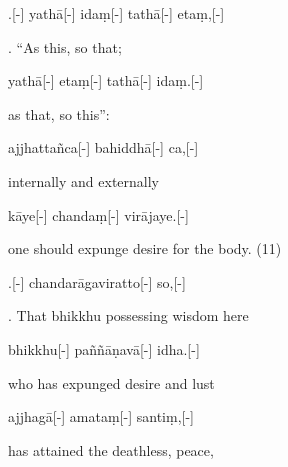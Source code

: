 \vskip 0.2in
\begin{samepage}
.[-] yathā[-] idaṃ[-] tathā[-] etaṃ,[-]
\endgl
\nopagebreak
\linespread{0.5}
\begin{spacin}{0.2}
{. “As this, so that;}
\end{spacin}
\vskip 12pt
\end{samepage}
\begin{samepage}
\begingl[glneveryline={\PaliGlossA,\PaliGlossB}]
yathā[-] etaṃ[-] tathā[-] idaṃ.[-]
\endgl
\nopagebreak
\linespread{0.5}
\begin{spacin}{0.2}
{\PaliGlossFT as that, so this”:}
\end{spacin}
\vskip 12pt
\end{samepage}
\begin{samepage}
\begingl[glneveryline={\PaliGlossA,\PaliGlossB}]
ajjhattañca[-] bahiddhā[-] ca,[-]
\endgl
\nopagebreak
\linespread{0.5}
\begin{spacin}{0.2}
{\PaliGlossFT internally and externally}
\end{spacin}
\vskip 12pt
\end{samepage}
\begin{samepage}
\begingl[glneveryline={\PaliGlossA,\PaliGlossB}]
kāye[-] chandaṃ[-] virājaye.[-]
\endgl
\nopagebreak
\linespread{0.5}
\begin{spacin}{0.2}
{\PaliGlossFT one should expunge desire for the body. (11)}
\end{spacin}
\vskip 12pt
\end{samepage}
\vskip 0.2in
\begin{samepage}
.[-] chandarāgaviratto[-] so,[-]
\endgl
\nopagebreak
\linespread{0.5}
\begin{spacin}{0.2}
{. That bhikkhu possessing wisdom here}
\end{spacin}
\vskip 12pt
\end{samepage}
\begin{samepage}
\begingl[glneveryline={\PaliGlossA,\PaliGlossB}]
bhikkhu[-] paññāṇavā[-] idha.[-]
\endgl
\nopagebreak
\linespread{0.5}
\begin{spacin}{0.2}
{\PaliGlossFT who has expunged desire and lust}
\end{spacin}
\vskip 12pt
\end{samepage}
\begin{samepage}
\begingl[glneveryline={\PaliGlossA,\PaliGlossB}]
ajjhagā[-] amataṃ[-] santiṃ,[-]
\endgl
\nopagebreak
\linespread{0.5}
\begin{spacin}{0.2}
{\PaliGlossFT has attained the deathless, peace,}
\end{spacin}
\vskip 12pt
\end{samepage}
